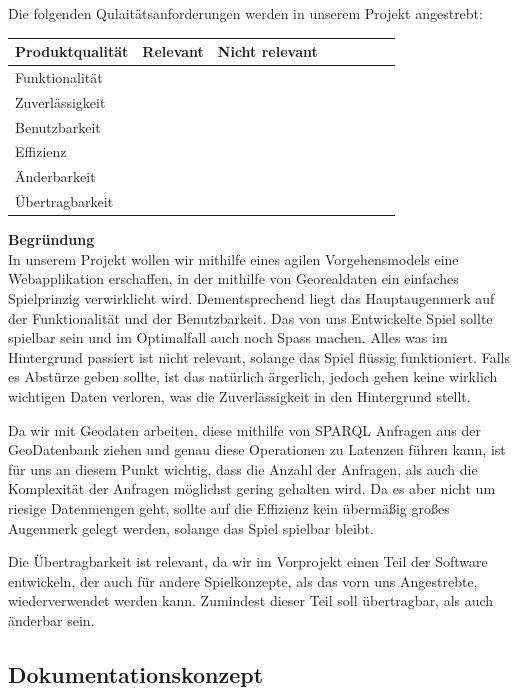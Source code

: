 \documentclass[11pt,a4paper]{article}
\newcommand{\cmark}{\ding{51}}%
\begin{document}
Die folgenden Qulaitätsanforderungen werden in unserem Projekt angestrebt:
\begin{center}
    \begin{tabular}{ | l | c | c | c | c | c | c | c | }
    \hline
     Produktqualität & Relevant & Nicht relevant \\ \hline
	 Funktionalität   & \cmark & \\ \hline
	 Zuverlässigkeit  &  & \cmark  \\ \hline	
	 Benutzbarkeit & \cmark &  \\ \hline
	 Effizienz & & \cmark  \\ \hline
	 Änderbarkeit &  \cmark &  \\ \hline
	 Übertragbarkeit &  \cmark & \\ \hline
	 
    \end{tabular}
\end{center}
\textbf{Begründung} \\
In unserem Projekt wollen wir mithilfe eines agilen Vorgehensmodels eine Webapplikation erschaffen, in der mithilfe von Georealdaten ein einfaches Spielprinzig verwirklicht wird. 
Dementsprechend liegt das Hauptaugenmerk auf der Funktionalität und der Benutzbarkeit.
Das von uns Entwickelte Spiel sollte spielbar sein und im Optimalfall auch noch Spass machen.
Alles was im Hintergrund passiert ist nicht relevant, solange das Spiel flüssig funktioniert.
Falls es Abstürze geben sollte, ist das natürlich ärgerlich, jedoch gehen keine wirklich wichtigen Daten verloren, was die Zuverlässigkeit in den Hintergrund stellt.

Da wir mit Geodaten arbeiten, diese mithilfe von SPARQL Anfragen aus der GeoDatenbank ziehen und genau diese Operationen zu Latenzen führen kann, ist für uns an diesem Punkt wichtig, dass die Anzahl der Anfragen, als auch die Komplexität der Anfragen möglichst gering gehalten wird.
Da es aber nicht um riesige Datenmengen geht, sollte auf die Effizienz kein übermäßig großes Augenmerk gelegt werden, solange das Spiel spielbar bleibt.

Die Übertragbarkeit ist relevant, da wir im Vorprojekt einen Teil der Software entwickeln, der auch für andere Spielkonzepte, als das vorn uns Angestrebte, wiederverwendet werden kann.
Zumindest dieser Teil soll übertragbar, als auch änderbar sein.




\subsection{Dokumentationskonzept}
\end{document}
